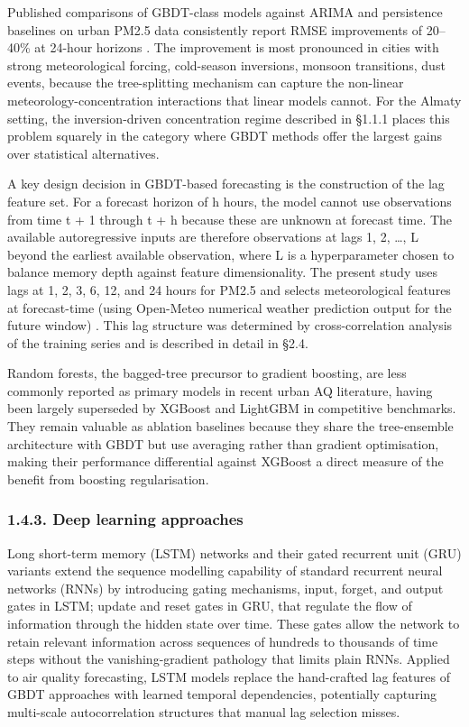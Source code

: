 Published comparisons of GBDT-class models against ARIMA and persistence baselines on urban PM2.5 data consistently report RMSE improvements of 20--40\% at 24-hour horizons \cite{enebish2021ulaanbaatar, menares2021forecasting}. The improvement is most pronounced in cities with strong meteorological forcing, cold-season inversions, monsoon transitions, dust events, because the tree-splitting mechanism can capture the non-linear meteorology-concentration interactions that linear models cannot. For the Almaty setting, the inversion-driven concentration regime described in §1.1.1 places this problem squarely in the category where GBDT methods offer the largest gains over statistical alternatives.

A key design decision in GBDT-based forecasting is the construction of the lag feature set. For a forecast horizon of h hours, the model cannot use observations from time t + 1 through t + h because these are unknown at forecast time. The available autoregressive inputs are therefore observations at lags 1, 2, \ldots, L beyond the earliest available observation, where L is a hyperparameter chosen to balance memory depth against feature dimensionality. The present study uses lags at 1, 2, 3, 6, 12, and 24 hours for PM2.5 and selects meteorological features at forecast-time (using Open-Meteo numerical weather prediction output for the future window) \cite{zippenfenig_openmeteo_2023}. This lag structure was determined by cross-correlation analysis of the training series and is described in detail in §2.4.

Random forests, the bagged-tree precursor to gradient boosting, are less commonly reported as primary models in recent urban AQ literature, having been largely superseded by XGBoost and LightGBM in competitive benchmarks. They remain valuable as ablation baselines because they share the tree-ensemble architecture with GBDT but use averaging rather than gradient optimisation, making their performance differential against XGBoost a direct measure of the benefit from boosting regularisation.

\subsubsection{1.4.3. Deep learning approaches}\label{deep-learning-approaches}

Long short-term memory (LSTM) networks and their gated recurrent unit (GRU) variants extend the sequence modelling capability of standard recurrent neural networks (RNNs) by introducing gating mechanisms, input, forget, and output gates in LSTM; update and reset gates in GRU, that regulate the flow of information through the hidden state over time. These gates allow the network to retain relevant information across sequences of hundreds to thousands of time steps without the vanishing-gradient pathology that limits plain RNNs. Applied to air quality forecasting, LSTM models replace the hand-crafted lag features of GBDT approaches with learned temporal dependencies, potentially capturing multi-scale autocorrelation structures that manual lag selection misses.

